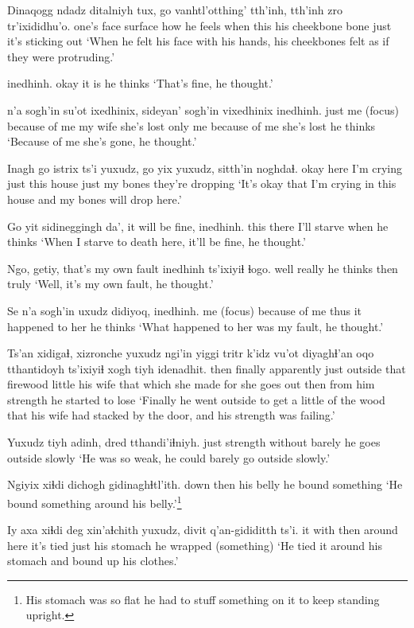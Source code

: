 \documentclass[12pt]{article}
\begin{document}
\gll Dinaqogg ndadz ditalniyh tux, go vanhtl'otthing' tth'inh, tth'inh zro tr'ixididhu'o.
{one's face surface} how {he feels} when this {his cheekbone} bone {} just {it's sticking out}
\glt `When he felt his face with his hands, his cheekbones felt as if they were protruding.'
\glend

 inedhinh.
okay {it is} {he thinks}
\glt `That's fine, he thought.'
\glend

 n'a sogh'in su'ot ixedhinix, sideyan' sogh'in vixedhinix inedhinh.
{just me} {(focus)} {because of me} {my wife} {she's lost} {only me} {because of me} {she's lost} {he thinks}
\glt `Because of me she's gone, he thought.'
\glend

\gll Inagh go istrix ts'i yuxudz, go yix yuxudz, sitth'in noghdaɬ.
okay here {I'm crying} {} just this house just {my bones} {they're dropping}
\glt `It's okay that I'm crying in this house and my bones will drop here.'
\glend

\gll Go yit sidineggingh da', {it will be fine,} inedhinh.
this there {I'll starve} when {} {he thinks}
\glt `When I starve to death here, it'll be fine, he thought.'
\glend

\gll Ngo, getiy, {that's my own fault} inedhinh ts'ixiyiɬ ɬogo.
well really {} {he thinks} then truly
\glt  `Well, it's my own fault, he thought.'
\glend

\gll Se n'a sogh'in uxudz didiyoq, inedhinh.
me {(focus)} {because of me} thus {it happened to her} {he thinks}
\glt `What happened to her was my fault, he thought.'
\glend

\gll Ts'an xidigaɬ, xizronche yuxudz ngi'in yiggi tritr k'idz vu'ot diyaghɬ'an oqo tthantidoyh ts'ixiyiɬ xogh tiyh idenadhit.
then finally apparently just outside that firewood little {his wife} {that which she made} for {she goes out} then {from him} strength {he started to lose}
\glt `Finally he went outside to get a little of the wood that his wife had stacked by the door, and his strength was failing.'
\glend

\gll Yuxudz tiyh adinh, dred tthandi'iɬniyh.
just strength without barely {he goes outside slowly}
\glt `He was so weak, he could barely go outside slowly.'
\glend

\gll Ngiyix xiɬdi dichogh gidinaghɬtl'ith.
down then {his belly} {he bound something}
\glt `He bound something around his belly.'\footnote{His stomach was so flat he had to stuff something on it to keep standing upright.}
\glend

\gll Iy axa xiɬdi deg xin'aɬchith yuxudz, divit q'an-gididitth ts'i.
it with then {around here} {it's tied} just {his stomach} {he wrapped (something)} {}
\glt `He tied it around his stomach and bound up his clothes.'
\glend
\end{document}
